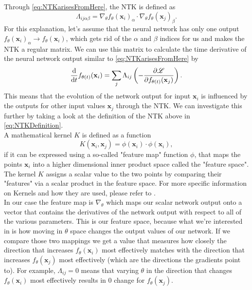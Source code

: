 Through \cref{eq:NTKarisesFromHere}, the NTK is defined as 
\begin{equation}\label{eq:NTKDefinition}
	\Lambda_{ij\alpha\beta} = \nabla_\theta f_\theta(\mathbf{x}_i)_\alpha \cdot \nabla_\theta f_\theta(\mathbf{x}_j)_\beta.
\end{equation}
For this explanation, let's assume that the neural network has only one output $f_\theta(\mathbf{x}_i)_\alpha \rightarrow f_\theta(\mathbf{x}_i)$, which gets rid of the $\alpha$ and $\beta$ indices for us and makes the NTK a regular matrix. We can use this matrix to calculate the time derivative of the neural network output similar to \cref{eq:NTKarisesFromHere} by 
\begin{equation}\label{eq:NTKExplanation}
	\frac{\mathrm{d}}{\mathrm{d}t}f_{\theta(t)}(\mathbf{x}_i) = \sum_j \Lambda_{ij} \left(- \frac{\partial\mathscr{L}}{\partial f_{\theta(t)}(\mathbf{x}_j)}\right).
\end{equation}
This means that the evolution of the network output for input $\mathbf{x}_i$ is influenced by the outputs for other input values $\mathbf{x}_j$ through the NTK. We can investigate this further by taking a look at the definition of the NTK above in \cref{eq:NTKDefinition}. \\
A mathematical kernel $K$ is defined as a function \cite{KernelMethod}
\begin{equation}
	K(\mathbf{x}_i, \mathbf{x}_j) = \phi(\mathbf{x}_i)\cdot\phi(\mathbf{x}_i),
\end{equation}
if it can be expressed using a so-called "feature map" function $\phi$, that maps the points $\mathbf{x}_i$ into a higher dimensional inner product space called the "feature space". The kernel $K$ assigns a scalar value to the two points by comparing their "features" via a scalar product in the feature space. For more specific information on Kernels and how they are used, please refer to \cite{KernelMethod}.\\
In our case the feature map is $\nabla_\theta$ which maps our scalar network output onto a vector that contains the derivatives of the network output with respect to all of the various parameters. This is our feature space, because what we're interested in is how moving in $\theta$ space changes the output values of our network. If we compare those two mappings we get a value that measures how closely the direction that increases $f_\theta(\mathbf{x}_i)$ most effectively matches with the direction that increases $f_\theta(\mathbf{x}_j)$ most effectively  (which are the directions the gradients point to). For example, $\Lambda_{ij}=0$ means that varying $\theta$ in the direction that changes $f_\theta(\mathbf{x}_i)$ most effectively results in 0 change for $f_\theta(\mathbf{x}_j)$.\\

